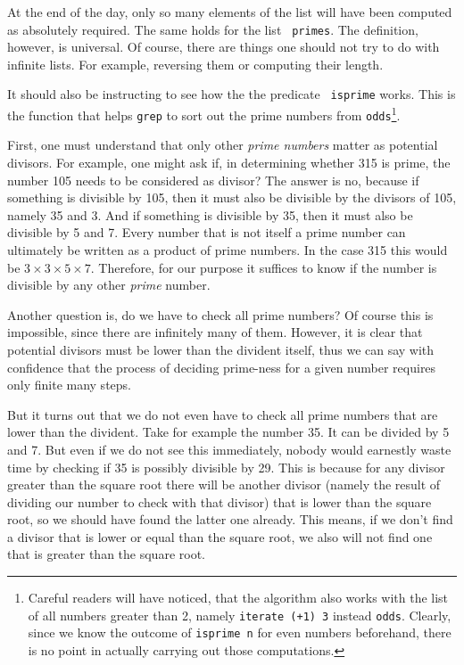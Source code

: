 \documentclass[a4paper,twocolumn,landscape]{report}
\begin{document}
At the end of the day, only so many elements of the list will have been
computed as absolutely required. The same holds for the list {\tt
primes}.
The definition, however, is universal. Of course, there are things one
should not try to do with infinite lists. For example, reversing them or
computing their length.

It should also be instructing to see how the the predicate {\tt
isprime} works. This is the function that helps {\tt grep} to sort out
the prime numbers from {\tt odds}\footnote{
Careful readers will have
noticed, that the algorithm also works with the list of all numbers
greater than 2, namely {\tt iterate (+1) 3} instead {\tt odds}. Clearly,
since we know the outcome of {\tt isprime n} for even numbers
beforehand, there is no point in actually carrying out those
computations.}.

First, one must understand that only other {\em prime numbers} matter as
potential divisors. For example, one might ask if, in determining
whether
315 is prime, the number 105 needs to be considered as divisor? The
answer is no, because if something is divisible by 105, then it must
also be divisible by the divisors of 105, namely 35 and 3. And if
something is divisible by 35, then it must also be divisible by 5 and 7.
Every number that is not itself a prime number
can ultimately be written as a
product of prime numbers. In the case 315 this would be
$3\times 3\times 5\times 7$.
Therefore, for
our purpose it suffices to know if the number is divisible by any other
\emph{prime} number.

Another question is, do we have to check all prime numbers? Of course this is impossible, since there are infinitely many of them. However, it is clear that potential divisors must be lower than the divident itself, thus we can say with confidence that the process of deciding prime-ness for a given number requires only finite many steps.

But it turns out that we do not even have to check all prime numbers that are lower than the divident.
Take for example the number 35. It can be divided by 5
and 7. But even if we do not see this immediately, nobody would earnestly
waste time by checking if 35 is possibly divisible by 29.
This is because for any divisor greater than the square root
there will be
another divisor (namely the result of dividing our number to check with
that divisor) that is lower than the square root, so we should have
found the latter one already. This means, if we don't find a divisor
that
is lower or equal than the square root, we also will not find one that
is greater than the square root.
\end{document}
